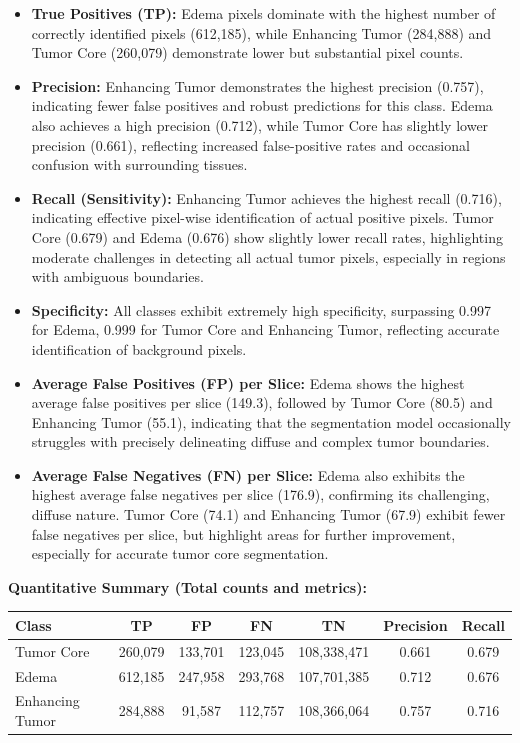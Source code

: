 \begin{itemize}
    \item \textbf{True Positives (TP):} Edema pixels dominate with the highest number of correctly identified pixels (612,185), while Enhancing Tumor (284,888) and Tumor Core (260,079) demonstrate lower but substantial pixel counts.

    \item \textbf{Precision:} Enhancing Tumor demonstrates the highest precision (0.757), indicating fewer false positives and robust predictions for this class. Edema also achieves a high precision (0.712), while Tumor Core has slightly lower precision (0.661), reflecting increased false-positive rates and occasional confusion with surrounding tissues.

    \item \textbf{Recall (Sensitivity):} Enhancing Tumor achieves the highest recall (0.716), indicating effective pixel-wise identification of actual positive pixels. Tumor Core (0.679) and Edema (0.676) show slightly lower recall rates, highlighting moderate challenges in detecting all actual tumor pixels, especially in regions with ambiguous boundaries.

    \item \textbf{Specificity:} All classes exhibit extremely high specificity, surpassing 0.997 for Edema, 0.999 for Tumor Core and Enhancing Tumor, reflecting accurate identification of background pixels.

    \item \textbf{Average False Positives (FP) per Slice:} Edema shows the highest average false positives per slice (149.3), followed by Tumor Core (80.5) and Enhancing Tumor (55.1), indicating that the segmentation model occasionally struggles with precisely delineating diffuse and complex tumor boundaries.

    \item \textbf{Average False Negatives (FN) per Slice:} Edema also exhibits the highest average false negatives per slice (176.9), confirming its challenging, diffuse nature. Tumor Core (74.1) and Enhancing Tumor (67.9) exhibit fewer false negatives per slice, but highlight areas for further improvement, especially for accurate tumor core segmentation.
\end{itemize}

\textbf{Quantitative Summary (Total counts and metrics):}

\begin{center}
\begin{tabular}{lcccccc}
\toprule
\textbf{Class} & \textbf{TP} & \textbf{FP} & \textbf{FN} & \textbf{TN} & \textbf{Precision} & \textbf{Recall} \\
\midrule
Tumor Core      & 260,079  & 133,701  & 123,045  & 108,338,471 & 0.661 & 0.679 \\
Edema           & 612,185  & 247,958  & 293,768  & 107,701,385 & 0.712 & 0.676 \\
Enhancing Tumor & 284,888  & 91,587   & 112,757  & 108,366,064 & 0.757 & 0.716 \\
\bottomrule
\end{tabular}
\end{center}

